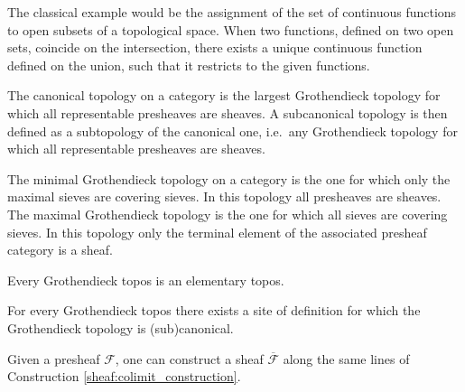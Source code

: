\begin{example}
        The classical example would be the assignment of the set of continuous functions to open subsets of a topological space. When two functions, defined on two open sets, coincide on the intersection, there exists a unique continuous function defined on the union, such that it restricts to the given functions.
    \end{example}

    \begin{example}
        The canonical topology on a category is the largest Grothendieck topology for which all representable presheaves are sheaves. A subcanonical topology is then defined as a subtopology of the canonical one, i.e.~any Grothendieck topology for which all representable presheaves are sheaves.
    \end{example}
    \begin{example}
        The minimal Grothendieck topology on a category is the one for which only the maximal sieves are covering sieves. In this topology all presheaves are sheaves. The maximal Grothendieck topology is the one for which all sieves are covering sieves. In this topology only the terminal element of the associated presheaf category is a sheaf.
    \end{example}

    \begin{property}
        Every Grothendieck topos is an elementary topos.
    \end{property}

    \begin{property}
        For every Grothendieck topos there exists a site of definition for which the Grothendieck topology is (sub)canonical.
    \end{property}

    \begin{construct}[Sheafification]
        Given a presheaf $\mathcal{F}$, one can construct a sheaf $\overline{\mathcal{F}}$ along the same lines of Construction \ref{sheaf:colimit_construction}.
    \end{construct}


